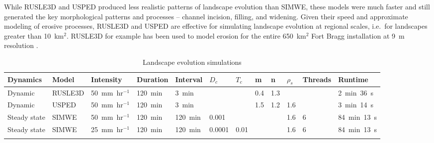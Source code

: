 \documentclass[gmd, manuscript]{copernicus}
\begin{document}
While RUSLE3D and USPED
produced less realistic patterns of landscape evolution
than SIMWE,
these models were much faster and still generated
the key morphological patterns and processes -- 
channel incision, filling, and widening. 
%
Given their speed
and approximate modeling of erosive processes, 
RUSLE3D and USPED 
are effective for simulating landscape evolution
at regional scales, 
i.e.~for landscapes greater than 10~\unit{km}$^{2}$. 
%
RUSLE3D for example has been used to
model erosion for the entire 650~\unit{km}$^{2}$ 
Fort Bragg installation at 9~\unit{m} resolution
\citep{Levine2018}. 


\begin{table}
\small
\caption{Landscape evolution simulations}
\begin{tabu} to \textwidth {XXXXXllllllX}
\toprule
Dynamics & Model & Intensity & Duration & Interval & $D_c$ & $T_c$ & m & n & $\rho_s$ & Threads & Runtime\\
\midrule
Dynamic & RUSLE3D & 50~\unit{mm~hr}$^{-1}$ & 120~\unit{min} & 3~\unit{min} &  &  & 0.4 & 1.3 & & & 2~\unit{min}~36~\unit{s}\\
Dynamic & USPED & 50~\unit{mm~hr}$^{-1}$ & 120~\unit{min} & 3~\unit{min} &  &  & 1.5 & 1.2 & 1.6 & & 3~\unit{min}~14~\unit{s}\\
Steady state & SIMWE & 50~\unit{mm~hr}$^{-1}$ & 120~\unit{min} & 120~\unit{min} & 0.001 & & & & 1.6 & 6 & 84~\unit{min}~13~\unit{s}\\
Steady state & SIMWE & 25~\unit{mm~hr}$^{-1}$ & 120~\unit{min} & 120~\unit{min} & 0.0001 & 0.01 & & & 1.6 & 6 & 84~\unit{min}~13~\unit{s}\\
\bottomrule
\\
\end{tabu}
\label{table:simulations} 
\end{table}

\end{document}
